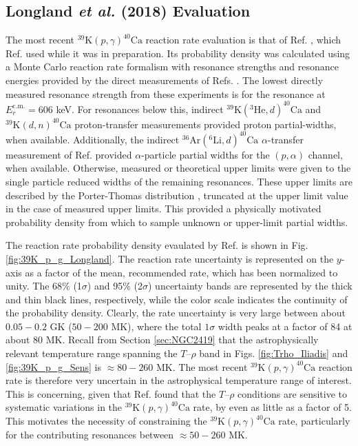 \subsection{Longland \emph{et al.} (2018) Evaluation}

The most recent $^{39}\mathrm{K}(p,\gamma)^{40}\mathrm{Ca}$ reaction rate evaluation is that of Ref. \cite{Longland2018}, which Ref. \cite{Dermigny2017} used while it was in preparation. Its probability density was calculated using a Monte Carlo reaction rate formalism \cite{Longland2010a} with resonance strengths and resonance energies provided by the direct measurements of Refs. \cite{Kikstra1990,Cheng1981,Leenhouts1966}. The lowest directly measured resonance strength from these experiments is for the resonance at $E^{\mathrm{c.m.}}_{r} = 606$ keV. For resonances below this, indirect $^{39}\mathrm{K}(^{3}\mathrm{He},d)^{40}\mathrm{Ca}$ \cite{Cage1971} and $^{39}\mathrm{K}(d,n)^{40}\mathrm{Ca}$ \cite{Fuchs1969} proton-transfer measurements provided proton partial-widths, when available. Additionally, the indirect $^{36}\mathrm{Ar}(^{6}\mathrm{Li},d)^{40}\mathrm{Ca}$ $\alpha$-transfer measurement of Ref. \cite{Yamaya1994} provided $\alpha$-particle partial widths for the $(p,\alpha)$ channel, when available. Otherwise, measured or theoretical upper limits were given to the single particle reduced widths of the remaining resonances. These upper limits are described by the Porter-Thomas distribution \cite{Porter1956,Weidenmuller2009}, truncated at the upper limit value in the case of measured upper limits. This provided a physically motivated probability density from which to sample unknown or upper-limit partial widths.

The reaction rate probability density evaulated by Ref. \cite{Longland2018} is shown in Fig. \ref{fig:39K_p_g_Longland}. The reaction rate uncertainty is represented on the $y$-axis as a factor of the mean, recommended rate, which has been normalized to unity. The 68$\%$ (1$\sigma$) and 95$\%$ (2$\sigma$) uncertainty bands are represented by the thick and thin black lines, respectively, while the color scale indicates the continuity of the probability density. Clearly, the rate uncertainty is very large between about $0.05-0.2$ GK ($50-200$ MK), where the total $1\sigma$ width peaks at a factor of 84 at about 80 MK. Recall from Section \ref{sec:NGC2419} that the astrophysically relevant temperature range spanning the $T$--$\rho$ band in Figs. \ref{fig:Trho_Iliadis} and \ref{fig:39K_p_g_Sens} is $\approx80-260$ MK. The most recent $^{39}\mathrm{K}(p,\gamma)^{40}\mathrm{Ca}$ reaction rate is therefore very uncertain in the astrophysical temperature range of interest. This is concerning, given that Ref. \cite{Dermigny2017} found that the $T$--$\rho$ conditions are sensitive to systematic variations in the $^{39}\mathrm{K}(p,\gamma)^{40}\mathrm{Ca}$ rate, by even as little as a factor of 5. This motivates the necessity of constraining the $^{39}\mathrm{K}(p,\gamma)^{40}\mathrm{Ca}$ rate, particularly for the contributing resonances between $\approx50-260$ MK.

